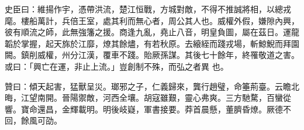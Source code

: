 \begin{pinyinscope}
 史臣曰：維揚作宇，憑帶洪流，楚江恒戰，方城對敵，不得不推誠將相，以總戎麾。樓船萬計，兵倍王室，處其利而無心者，周公其人也。威權外假，嫌隙內興，彼有順流之師，此無強籓之援。商逢九亂，堯止八音，明皇負圖，屬在茲日。運龍韜於掌握，起天旆於江靡，燎其餘燼，有若秋原。去縗絰而踐戎場，斬鯨鯢而拜園闕。鎮削威權，州分江漢，覆車不踐。貽厥孫謀。其後七十餘年，終罹敬道之害。或曰：「興亡在運，非止上流。」豈創制不殊，而弘之者異
 也。



 贊曰：傾天起害，猛獸呈災。瑯邪之子，仁義歸來，龔行趙璧，命箠荊臺。云瞻北晦，江望南開。晉陽禦敵，河西全壤。胡寇雖艱，靈心弗爽。三方馳騖，百蠻從響。寶命還昌，金輝載明。明後岐嶷，軍書接要。莽首晨懸，董臍昏燎。厥德不回，餘風可劭。



\end{pinyinscope}